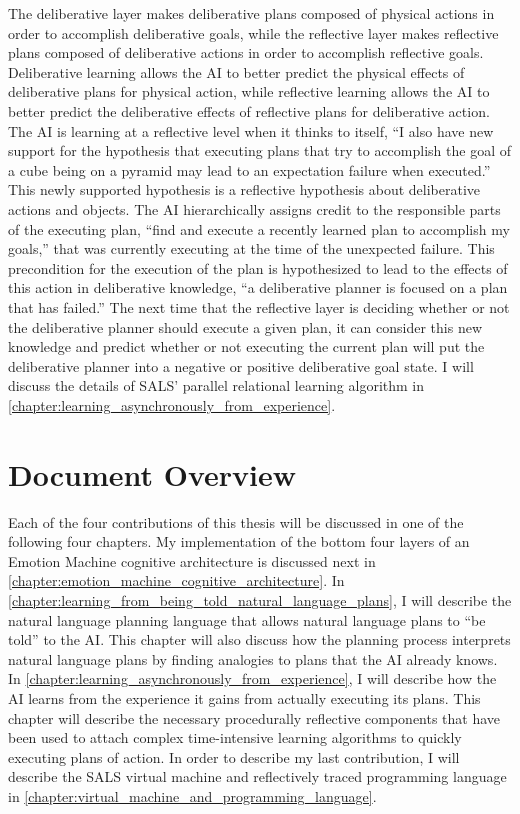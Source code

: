 The deliberative layer makes deliberative plans composed of physical
actions in order to accomplish deliberative goals, while the
reflective layer makes reflective plans composed of deliberative
actions in order to accomplish reflective goals.  Deliberative
learning allows the AI to better predict the physical effects of
deliberative plans for physical action, while reflective learning
allows the AI to better predict the deliberative effects of reflective
plans for deliberative action.  The AI is learning at a reflective
level when it thinks to itself, ``I also have new support for the
hypothesis that executing plans that try to accomplish the goal of a
cube being on a pyramid may lead to an expectation failure when
executed.''  This newly supported hypothesis is a reflective
hypothesis about deliberative actions and objects.  The AI
hierarchically assigns credit to the responsible parts of the
executing plan, ``find and execute a recently learned plan to
accomplish my goals,'' that was currently executing at the time of the
unexpected failure.  This precondition for the execution of the plan
is hypothesized to lead to the effects of this action in deliberative
knowledge, ``a deliberative planner is focused on a plan that has
failed.''  The next time that the reflective layer is deciding whether
or not the deliberative planner should execute a given plan, it can
consider this new knowledge and predict whether or not executing the
current plan will put the deliberative planner into a negative or
positive deliberative goal state.  I will discuss the details of SALS'
parallel relational learning algorithm in
{\mbox{\autoref{chapter:learning_asynchronously_from_experience}}}.

\section{Document Overview}

Each of the four contributions of this thesis will be discussed in one
of the following four chapters.  My implementation of the bottom four
layers of an Emotion Machine cognitive architecture is discussed next
in {\mbox{\autoref{chapter:emotion_machine_cognitive_architecture}}}.
In
{\mbox{\autoref{chapter:learning_from_being_told_natural_language_plans}}},
I will describe the natural language planning language that allows
natural language plans to ``be told'' to the AI.  This chapter will
also discuss how the planning process interprets natural language
plans by finding analogies to plans that the AI already knows.  In
{\mbox{\autoref{chapter:learning_asynchronously_from_experience}}}, I
will describe how the AI learns from the experience it gains from
actually executing its plans.  This chapter will describe the
necessary procedurally reflective components that have been used to
attach complex time-intensive learning algorithms to quickly executing
plans of action.  In order to describe my last contribution, I will
describe the SALS virtual machine and reflectively traced programming
language in
{\mbox{\autoref{chapter:virtual_machine_and_programming_language}}}.

